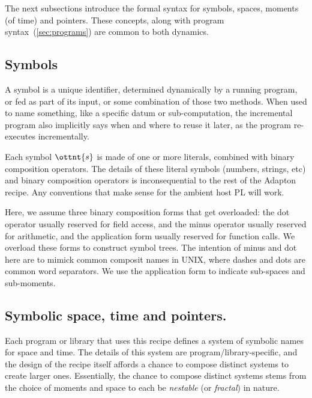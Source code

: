 \documentclass[11pt]{article}
\begin{document}
The next subsections introduce the formal syntax for symbols, spaces, moments (of time) and pointers.
%
These concepts, along with program syntax~(\cref{sec:programs}) are common to both dynamics.

\subsection{Symbols}
\label{sec:symbols}

A symbol is a
unique identifier, determined dynamically by a running program, or fed
as part of its input, or some combination of those two methods.
%
When used to name something, like a specific datum or sub-computation,
the incremental program also implicitly says when and where to reuse
it later, as the program re-executes incrementally.

\ottgrammartabular{
  \otts
}

Each symbol $\ottnt{s}$ is made of one or more literals,
combined with binary composition operators.
%
The details of these literal symbols (numbers, strings, etc) and
binary composition operators is inconsequential to the rest of the
Adapton recipe.  Any conventions that make sense for the ambient host PL will work.

Here, we assume three binary composition forms that get overloaded: the
dot operator usually reserved for field access, and the minus operator
usually reserved for arithmetic, and the application form usually reserved for function calls.
%
We overload these forms to construct symbol trees.
%
The intention of minus and dot here are to mimick common composit
names in UNIX, where dashes and dots are common word separators.
%
We use the application form to indicate sub-spaces and sub-moments.

\subsection{Symbolic space, time and pointers.}
\label{sec:symbolic-space}
\label{sec:symbolic-time}
\label{sec:symbolic-pointers}

Each program or library that uses this recipe
defines a system of symbolic names for space and time.
The details of this system are program/library-specific, and the
design of the recipe itself affords a chance to compose distinct systems to
create larger ones.
Essentially, the chance to compose distinct systems stems from the choice of moments
and space to each be \emph{nestable} (or \emph{fractal}) in nature.
\end{document}

